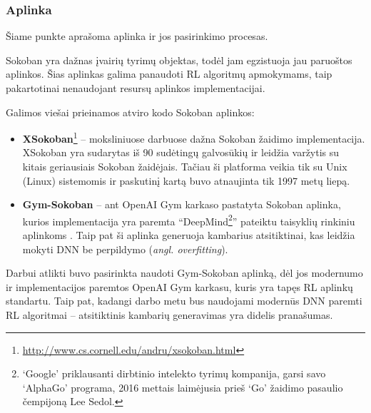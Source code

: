 \documentclass{VUMIFPSbakalaurinis}
\begin{document}
\subsubsection{Aplinka}
Šiame punkte aprašoma aplinka ir jos pasirinkimo procesas.
\label{subsubsubsec:environment_choice}
{
	Sokoban yra dažnas įvairių tyrimų objektas, todėl jam egzistuoja jau paruoštos aplinkos. Šias aplinkas galima panaudoti RL algoritmų apmokymams, taip pakartotinai nenaudojant resursų aplinkos implementacijai. \par
	Galimos viešai prieinamos atviro kodo Sokoban aplinkos:
	\begin{itemize}
		\item \textbf{XSokoban}\footnote{\url{http://www.cs.cornell.edu/andru/xsokoban.html}} \cite{myers1995xsokoban} -- moksliniuose darbuose dažna Sokoban žaidimo implementacija. XSokoban yra sudarytas iš 90 sudėtingų galvosūkių ir leidžia varžytis su kitais geriausiais Sokoban žaidėjais. Tačiau ši platforma veikia tik su Unix (Linux) sistemomis ir paskutinį kartą buvo atnaujinta tik 1997 metų liepą.
		\item \textbf{Gym-Sokoban} \cite{SchraderSokoban2018} -- ant OpenAI Gym \cite{openaiGym} karkaso pastatyta Sokoban aplinka, kurios implementacija yra paremta \enquote{DeepMind\footnote{\enquote{Google} priklausanti dirbtinio intelekto tyrimų kompanija, garsi savo \enquote{AlphaGo} programa, 2016 mettais laimėjusia prieš \enquote{Go} žaidimo pasaulio čempijoną Lee Sedol.}} pateiktu taisyklių rinkiniu aplinkoms \cite{NIPS2017_7152}. Taip pat ši aplinka generuoja kambarius atsitiktinai, kas leidžia mokyti DNN be perpildymo (\textit{angl. overfitting}).
	\end{itemize}

	Darbui atlikti buvo pasirinkta naudoti Gym-Sokoban aplinką, dėl jos modernumo ir implementacijos paremtos OpenAI Gym karkasu, kuris yra tapęs RL aplinkų standartu. Taip pat, kadangi darbo metu bus naudojami modernūs DNN paremti RL algoritmai -- atsitiktinis kambarių generavimas yra didelis pranašumas.
}
\label{subsubsubsec:gym}
\end{document}
